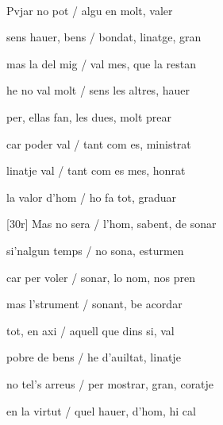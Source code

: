 \documentclass[12pt]{article}
\renewcommand{\espaiAbansEtiquetaPoema}{\vspace{0ex}}
\begin{document}
\begin{estrofa}

\espaiAbansEtiquetaPoema

\\

\end{estrofa}


\begin{estrofa}

 Pvjar no pot / algu en molt, valer

 sens hauer, bens / bondat, linatge, gran

 mas la del mig / val mes, que la restan

 he no val molt / sens les altres, hauer

 per, ellas fan, les dues, molt prear

 car poder val / tant com es, ministrat

 linatje val / tant com es mes, honrat

 la valor d'hom / ho fa tot, graduar

\end{estrofa}



\begin{estrofa}

 [30r] Mas no sera / l'hom, sabent, de sonar

 si'nalgun temps / no sona, esturmen

 car per voler / sonar, lo nom, nos pren

 mas l'strument / sonant, be acordar

 tot, en axi / aquell que dins si, val

 pobre de bens / he d'auiltat, linatje

 no tel's arreus \cite{ref29} / per mostrar, gran, coratje

 en la virtut / quel hauer, d'hom, hi cal

\end{estrofa}
\end{document}
